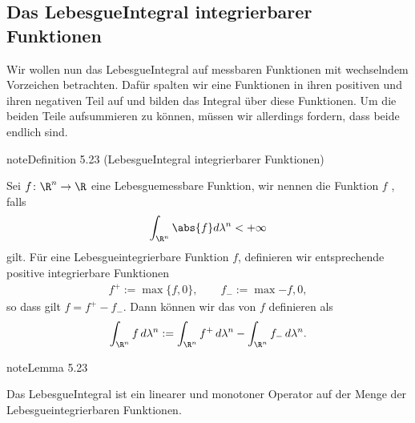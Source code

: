 \documentclass[letterpaper,10pt,german]{jupyterBook}
\begin{document}
\subsection{Das Lebesgue\sphinxhyphen{}Integral integrierbarer Funktionen}
\label{\detokenize{masstheorie/lebesgue_integral:das-lebesgue-integral-integrierbarer-funktionen}}
\sphinxAtStartPar
Wir wollen nun das Lebesgue\sphinxhyphen{}Integral auf messbaren Funktionen mit wechselndem Vorzeichen betrachten. Dafür spalten wir eine Funktionen in ihren positiven und ihren negativen Teil auf und bilden das Integral über diese Funktionen. Um die beiden Teile aufsummieren zu können, müssen wir allerdings fordern, dass beide endlich sind.
\label{masstheorie/lebesgue_integral:definition-16}
\begin{sphinxadmonition}{note}{Definition 5.23 (Lebesgue\sphinxhyphen{}Integral integrierbarer Funktionen)}



\sphinxAtStartPar
Sei \(f \colon \R^n \rightarrow \R\) eine Lebesgue\sphinxhyphen{}messbare Funktion, wir nennen die Funktion \(f\) , falls
\begin{equation*}
\begin{split}\int_{\R^n} \abs{f} d\lambda^n < +\infty\end{split}
\end{equation*}
\sphinxAtStartPar
gilt. Für eine Lebesgue\sphinxhyphen{}integrierbare Funktion \(f\), definieren wir entsprechende positive integrierbare Funktionen
\begin{equation*}
\begin{split}f^+ := \max \lbrace f, 0 \rbrace, \qquad f_- := \max{-f, 0},\end{split}
\end{equation*}
\sphinxAtStartPar
so dass gilt \(f = f^+ - f_-\). Dann können wir das  von \(f\) definieren als
\begin{equation*}
\begin{split}\int_{\R^n} f\, d\lambda^n := \int_{\R^n} f^+\, d\lambda^n - \int_{\R^n} f_-\, d\lambda^n.\end{split}
\end{equation*}\end{sphinxadmonition}
\label{masstheorie/lebesgue_integral:lemma-17}
\begin{sphinxadmonition}{note}{Lemma 5.23}



\sphinxAtStartPar
Das Lebesgue\sphinxhyphen{}Integral ist ein linearer und monotoner Operator auf der Menge der Lebesgue\sphinxhyphen{}integrierbaren Funktionen.
\end{sphinxadmonition}
\end{document}
